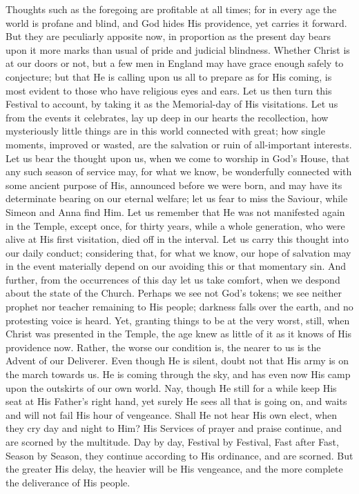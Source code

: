 Thoughts such as the foregoing are profitable at all times; for in
every age the world is profane and blind, and God hides His providence,
yet carries it forward. But they are peculiarly apposite now, in
proportion as the present day bears upon it more marks than usual of
pride and judicial blindness. Whether Christ is at our doors or not, but
a few men in England may have grace enough safely to conjecture; but
that He is calling upon us all to prepare as for His coming, is most
evident to those who have religious eyes and ears. Let us then turn this
Festival to account, by taking it as the Memorial-day of His
visitations. Let us from the events it celebrates, lay up deep in our
hearts the recollection, how mysteriously little things are in this
world connected with great; how single moments, improved or wasted, are
the salvation or ruin of all-important interests. Let us bear the
thought upon us, when we come to worship in God's House, that any such
season of service may, for what we know, be wonderfully connected with
some ancient purpose of His, announced before we were born, and may have
its determinate bearing on our eternal welfare; let us fear to miss the
Saviour, while Simeon and Anna find Him. Let us remember that He was not
manifested again in the Temple, except once, for thirty years, while a
whole generation, who were alive at His first visitation, died off in
the interval. Let us carry this thought into our daily conduct;
considering that, for what we know, our hope of salvation may in the
event materially depend on our avoiding this or that momentary sin. And
further, from the occurrences of this day let us take comfort, when we
despond about the state of the Church. Perhaps we see not God's tokens;
we see neither prophet nor teacher remaining to His people; darkness
falls over the earth, and no protesting voice is heard. Yet, granting
things to be at the very worst, still, when Christ was presented in the
Temple, the age knew as little of it as it knows of His providence now.
Rather, the worse our condition is, the nearer to us is the Advent of
our Deliverer. Even though He is silent, doubt not that His army is on
the march towards us. He is coming through the sky, and has even now His
camp upon the outskirts of our own world. Nay, though He still for a
while keep His seat at His Father's right hand, yet surely He sees all
that is going on, and waits and will not fail His hour of vengeance.
Shall He not hear His own elect, when they cry day and night to Him? His
Services of prayer and praise continue, and are scorned by the
multitude. Day by day, Festival by Festival, Fast after Fast, Season by
Season, they continue according to His ordinance, and are scorned. But
the greater His delay, the heavier will be His vengeance, and the more
complete the deliverance of His people.

